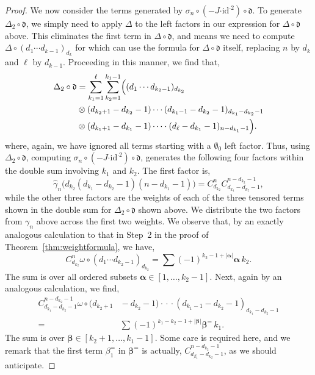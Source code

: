 \documentclass[10pt,a4paper]{amsart}
\newcommand*{\balpha}{\boldsymbol{\alpha}}
\newcommand*{\bbeta}{\boldsymbol{\beta}}
\newcommand*{\cendot}{\boldsymbol{\cdot}}
\newcommand*{\df}{\mathfrak d}
\newcommand*{\id}{{\mathrm{id}}}
\begin{document}
\begin{proof}
We now consider the terms generated by $\sigma_n\circ(-J\cendot\id^{\cendot2})\circ\df$.
To generate $\Delta_2\circ\df$, we simply need to apply $\Delta$ to the left factors in our expression for $\Delta\circ\df$ above.
This eliminates the first term in $\Delta\circ\df$, and means we need to compute $\Delta\circ(d_1\cdots d_{k-1})_{d_k}$ for which can use the formula for $\Delta\circ\df$ itself, replacing $n$ by $d_k$ and $\ell$ by $d_{k-1}$.
Proceeding in this manner, we find that,
\begin{align*}
\Delta_2\circ\df&=\sum_{k_1=1}^\ell\sum_{k_2=1}^{k_1-1}\Bigl((d_1\cdots d_{k_2-1})_{d_{k_2}}\\
&\otimes(d_{k_2+1}-d_{k_2}-1)\cdots(d_{k_1-1}-d_{k_2}-1)_{d_{k_1}-d_{k_2}-1}\\
&\otimes(d_{k_1+1}-d_{k_1}-1)\cdots\cdot(d_\ell-d_{k_1}-1)_{n-d_{k_1}-1}\Bigr).
\end{align*}
where, again, we have ignored all terms starting with a $\emptyset_0$ left factor.
Thus, using $\Delta_2\circ\df$, computing $\sigma_n\circ(-J\cendot\id^{\cendot2})\circ\df$, generates the following four factors within the double sum involving $k_1$ and $k_2$. 
The first factor is,
\begin{equation*}
\hat{\gamma}_n\bigl(d_{k_2}(d_{k_1}-d_{k_2}-1)(n-d_{k_1}-1)\bigr)=C_{d_{k_2}}^nC_{d_{k_1}-d_{k_2}-1}^{n-d_{k_2}-1},
\end{equation*}
while the other three factors are the weights of each of the three tensored terms shown in the double sum for $\Delta_2\circ\df$ shown above.
We distribute the two factors from $\gamma_n$ above across the first two weights.
We observe that, by an exactly analogous calculation to that in Step~2 in the proof of Theorem~\ref{thm:weightformula}, we have,
\begin{equation}\label{eq:mainstep3a}
    C_{d_{k_2}}^n\omega\circ(d_1\cdots d_{k_2-1})_{d_{k_2}}=\sum(-1)^{k_2-1+|\balpha|}\balpha\,k_2.
\end{equation}
The sum is over all ordered subsets $\balpha\in[1,\ldots,k_2-1]$. Next, again by an analogous calculation, we find,
\begin{align}
  C_{d_{k_1}-d_{k_2}-1}^{n-d_{k_2}-1}\omega\!\circ\!(d_{k_2+1}&\!-\!d_{k_2}\!-\!1)\!\cdot\!\cdot\!\cdot\!(d_{k_1-1}\!-\!d_{k_2}\!-\!1)_{d_{k_1}-d_{k_2}-1}\nonumber\\
  =&\sum(-1)^{k_1-k_2-1+|\bbeta|}\bbeta^=\,k_1.\label{eq:mainstep3b}
\end{align}
The sum is over $\bbeta\in[k_2+1,\ldots,k_1-1]$.
Some care is required here, and we remark that the first term $\beta_1^=$ in $\bbeta^=$ is actually, $C_{d_{\beta_1}-d_{k_2}-1}^{n-d_{k_2}-1}$, as we should anticipate.

\end{proof}
\end{document}

